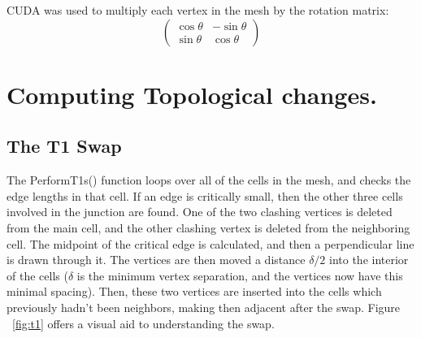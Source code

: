 CUDA was used to multiply each vertex in the mesh by the rotation matrix:
\[ \left( \begin{array}{cc}
\cos\theta & -\sin\theta \\
\sin\theta & \cos\theta 
\end{array} \right)\] 

\section{Computing Topological changes.}
\subsection{The T1 Swap}
The PerformT1s() function loops over all of the cells in the mesh, and checks the edge lengths in that cell. If an edge is critically small, then the other three cells involved in the junction are found. One of the two clashing vertices is deleted from the main cell, and the other clashing vertex is deleted from the neighboring cell. The midpoint of the critical edge is calculated, and then a perpendicular line is drawn through it. The vertices are then moved a distance $\delta/2$ into the interior of the cells ($\delta$ is the minimum vertex separation, and the vertices now have this minimal spacing). Then, these two vertices are inserted into the cells which previously hadn't been neighbors, making then adjacent after the swap. Figure ~\ref{fig:t1} offers a visual aid to understanding the swap. 

